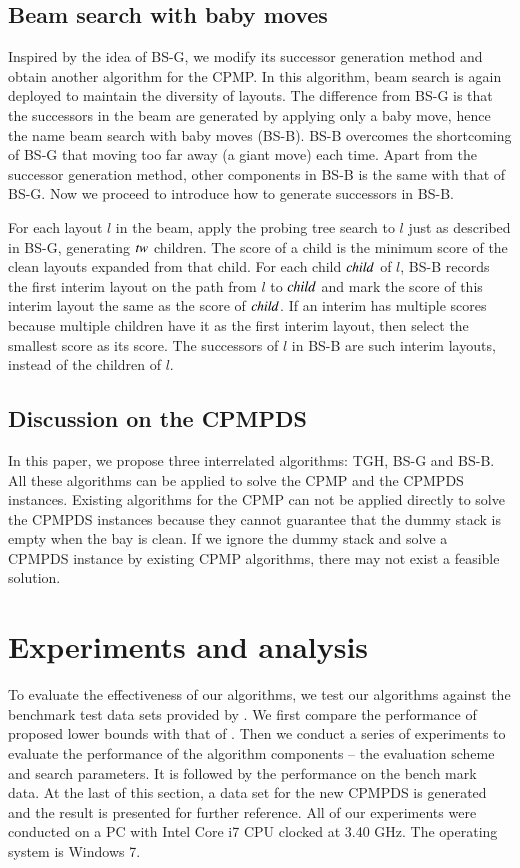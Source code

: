 \documentclass[review,3p,times,authoryear,12pt]{elsarticle}
\begin{document}
\subsection{Beam search with baby moves}

Inspired by the idea of BS-G, we modify its successor generation method and obtain another algorithm for the CPMP. In this algorithm, beam search is again deployed to maintain the diversity of layouts. The difference from BS-G is that the successors in the beam are generated by applying only a baby move, hence the name beam search with baby moves (BS-B). BS-B overcomes the shortcoming of BS-G that moving too far away (a giant move) each time. Apart from the successor generation method, other components in BS-B is the same with that of BS-G. Now we proceed to introduce how to generate successors in BS-B.

For each layout $l$ in the beam, apply the probing tree search to $l$ just as described in BS-G, generating $\id{tw}$ children. The score of a child is the minimum score of the clean layouts expanded from that child. For each child $\id{child}$ of $l$, BS-B records the first interim layout on the path from $l$ to $\id{child}$ and mark the score of this interim layout the same as the score of $\id{child}$. If an interim has multiple scores because multiple children have it as the first interim layout, then select the smallest score as its score. The successors of $l$ in BS-B are such interim layouts, instead of the children of $l$.

\subsection{Discussion on the CPMPDS}
In this paper, we propose three interrelated algorithms: TGH, BS-G and BS-B. All these algorithms can be applied to solve the CPMP and the CPMPDS instances. Existing algorithms for the CPMP can not be applied directly to solve the CPMPDS instances because they cannot guarantee that the dummy stack is empty when the bay is clean. If we ignore the dummy stack and solve a CPMPDS instance by existing CPMP algorithms, there may not exist a feasible solution.
\section{Experiments and analysis}
\label{sec:ce}
To evaluate the effectiveness of our algorithms, we test our algorithms against the benchmark test data sets provided by \cite{BF2012}.
We first compare the performance of proposed lower bounds with that of \cite{BF2012}. Then we conduct a series of experiments to evaluate the performance of the algorithm components -- the evaluation scheme and search parameters.
It is followed by the performance on the bench mark data.
At the last of this section, a data set for the new CPMPDS is generated and the result is presented for further reference. All of our experiments were conducted on a PC with Intel Core i7 CPU clocked at 3.40 GHz. The operating system is Windows 7.
\end{document}
